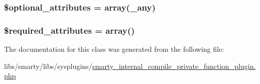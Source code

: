 \subsubsection[{\$optional\+\_\+attributes}]{\setlength{\rightskip}{0pt plus 5cm}\$optional\+\_\+attributes = array(\textquotesingle{}\+\_\+any\textquotesingle{})}\label{class_smarty___internal___compile___private___function___plugin_a899d1eb4a6fecbd6ce696adb171c80a4}
\hypertarget{class_smarty___internal___compile___private___function___plugin_ae799507d5461de485f3a618abeecea95}{}
\subsubsection[{\$required\+\_\+attributes}]{\setlength{\rightskip}{0pt plus 5cm}\$required\+\_\+attributes = array()}\label{class_smarty___internal___compile___private___function___plugin_ae799507d5461de485f3a618abeecea95}


The documentation for this class was generated from the following file\+:\begin{DoxyCompactItemize}
\item 
libs/smarty/libs/sysplugins/\hyperlink{smarty__internal__compile__private__function__plugin_8php}{smarty\+\_\+internal\+\_\+compile\+\_\+private\+\_\+function\+\_\+plugin.\+php}\end{DoxyCompactItemize}
